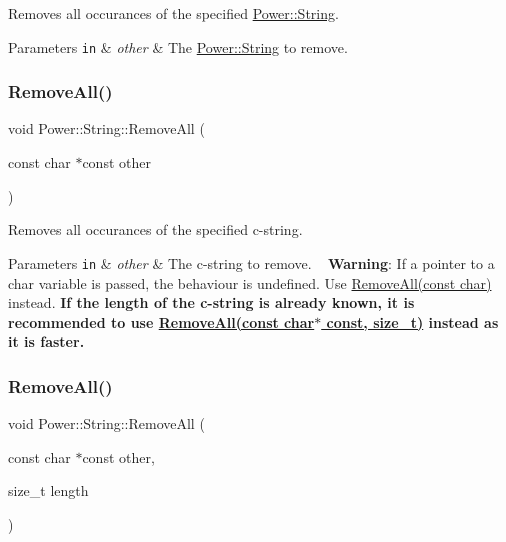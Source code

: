 Removes all occurances of the specified \hyperlink{class_power_1_1_string}{Power\+::\+String}. 


\begin{DoxyParams}[1]{Parameters}
\mbox{\tt in}  & {\em other} & The \hyperlink{class_power_1_1_string}{Power\+::\+String} to remove. \\
\hline
\end{DoxyParams}
\mbox{\label{class_power_1_1_string_a1b237c81ea2a466c192cdd63e706f455}} 
\subsubsection{\texorpdfstring{Remove\+All()}{RemoveAll()}\hspace{0.1cm}{\footnotesize\ttfamily [2/4]}}
{\footnotesize\ttfamily void Power\+::\+String\+::\+Remove\+All (\begin{DoxyParamCaption}\item[{const char $\ast$const}]{other }\end{DoxyParamCaption})\hspace{0.3cm}{\ttfamily [inline]}}



Removes all occurances of the specified c-\/string. 


\begin{DoxyParams}[1]{Parameters}
\mbox{\tt in}  & {\em other} & The c-\/string to remove. ~\newline
 {\bfseries Warning}\+: If a pointer to a char variable is passed, the behaviour is undefined. Use \hyperlink{class_power_1_1_string_ac1a456c7f0f019263c424431b0fbeefa}{Remove\+All(const char)} instead.  {\bfseries If the length of the c-\/string is already known, it is recommended to use \hyperlink{class_power_1_1_string_a6418c5e3a28ef177a3516c17be3bfcb3}{Remove\+All(const char$\ast$ const, size\+\_\+t)} instead as it is faster.} \\
\hline
\end{DoxyParams}
\mbox{\label{class_power_1_1_string_a6418c5e3a28ef177a3516c17be3bfcb3}} 
\subsubsection{\texorpdfstring{Remove\+All()}{RemoveAll()}\hspace{0.1cm}{\footnotesize\ttfamily [3/4]}}
{\footnotesize\ttfamily void Power\+::\+String\+::\+Remove\+All (\begin{DoxyParamCaption}\item[{const char $\ast$const}]{other,  }\item[{size\+\_\+t}]{length }\end{DoxyParamCaption})\hspace{0.3cm}{\ttfamily [inline]}}



